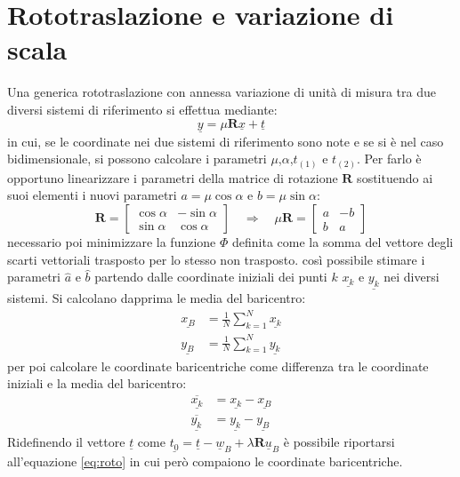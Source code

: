\chapter{Rototraslazione e variazione di scala}\label{cap:cap3}
Una generica rototraslazione con annessa variazione di unità di misura tra due diversi sistemi di riferimento si effettua mediante:
\begin{equation}
	\label{eq:roto}
	\underline{y}=\mu \mathbf{R} \underline{x}+\underline{t}
\end{equation}
in cui, se le coordinate nei due sistemi di riferimento sono note e se si è nel caso bidimensionale, si possono calcolare i parametri $\mu$,$\alpha$,$t_{(1)}$ e $t_{(2)}$.
Per farlo è opportuno linearizzare i parametri della matrice di rotazione $\mathbf{R}$ sostituendo ai suoi elementi i nuovi parametri $a=\mu\cos\alpha$ e $b=\mu\sin\alpha$:
\[
\mathbf{R}=
\begin{bmatrix}
\cos\alpha & -\sin\alpha \\ 
\sin\alpha & \cos\alpha
\end{bmatrix} 
\quad \Longrightarrow \quad
\mu \mathbf{R} = 
\begin{bmatrix}
a & -b \\ 
b & a
\end{bmatrix} 
\]
\e necessario poi minimizzare la funzione $\Phi$ definita come la somma del vettore degli scarti vettoriali trasposto per lo stesso non trasposto.
\e così possibile stimare i parametri $\hat{a}$ e $\hat{b}$ partendo dalle coordinate iniziali dei punti $k$ $\underline{x_k}$ e $\underline{y_k}$ nei diversi sistemi.
Si calcolano dapprima le media del baricentro:
\begin{align}
\label{eq:media}
\underline{x_B} &= \frac{1}{N}\sum_{k=1}^{N}\underline{x_k}\\
\underline{y_B} &= \frac{1}{N}\sum_{k=1}^{N}\underline{y_k}
\end{align}
per poi calcolare le coordinate baricentriche come differenza tra le coordinate iniziali e la media del baricentro:
\begin{align}
\overline{\underline{x_k}} &= \underline{x_k} - \underline{x_B}\\
\label{eq:baricentriche}
\overline{\underline{y_k}} &= \underline{y_k} - \underline{y_B}
\end{align}
Ridefinendo il vettore $\underline{t}$ come $\underline{t_{0}}=\underline{t}-\underline{w}_{B}+\lambda \mathbf{R} \underline{u}_{B}$ è possibile riportarsi all'equazione \eqref{eq:roto} in cui però compaiono le coordinate baricentriche.
